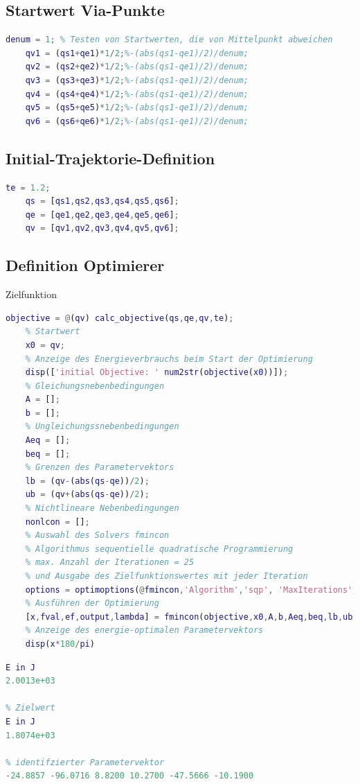 \subsection{Startwert Via-Punkte}
%
\begin{lstlisting}[language=Matlab, numbers=none]
	denum = 1; % Testen von Startwerten, die von Mittelpunkt abweichen
	qv1 = (qs1+qe1)*1/2;%-(abs(qs1-qe1)/2)/denum;
	qv2 = (qs2+qe2)*1/2;%-(abs(qs1-qe1)/2)/denum;
	qv3 = (qs3+qe3)*1/2;%-(abs(qs1-qe1)/2)/denum;
	qv4 = (qs4+qe4)*1/2;%-(abs(qs1-qe1)/2)/denum;
	qv5 = (qs5+qe5)*1/2;%-(abs(qs1-qe1)/2)/denum;
	qv6 = (qs6+qe6)*1/2;%-(abs(qs1-qe1)/2)/denum;
\end{lstlisting}
%
\subsection{Initial-Trajektorie-Definition}
%
\begin{lstlisting}[language=Matlab, numbers=none]
	te = 1.2;
	qs = [qs1,qs2,qs3,qs4,qs5,qs6];
	qe = [qe1,qe2,qe3,qe4,qe5,qe6];
	qv = [qv1,qv2,qv3,qv4,qv5,qv6];
\end{lstlisting}
%
\subsection{Definition Optimierer}
%
\begin{par}
	Zielfunktion
\end{par} \vspace{1em}
\begin{lstlisting}[language=Matlab, numbers=none]
	objective = @(qv) calc_objective(qs,qe,qv,te);
	% Startwert
	x0 = qv;
	% Anzeige des Energieverbrauchs beim Start der Optimierung
	disp(['initial Objective: ' num2str(objective(x0))]);
	% Gleichungsnebenbedingungen
	A = [];
	b = [];
	% Ungleichungssnebenbedingungen
	Aeq = [];
	beq = [];
	% Grenzen des Parametervektors
	lb = (qv-(abs(qs-qe))/2);
	ub = (qv+(abs(qs-qe))/2);
	% Nichtlineare Nebenbedingungen
	nonlcon = [];
	% Auswahl des Solvers fmincon
	% Algorithmus sequentielle quadratische Programmierung
	% max. Anzahl der Iterationen = 25
	% und Ausgabe des Zielfunktionswertes mit jeder Iteration
	options = optimoptions(@fmincon,'Algorithm','sqp', 'MaxIterations', 25,'PlotFcn',@optimplotfval);
	% Ausführen der Optimierung
	[x,fval,ef,output,lambda] = fmincon(objective,x0,A,b,Aeq,beq,lb,ub,nonlcon,options);
	% Anzeige des energie-optimalen Parametervektors
	disp(x*180/pi)
\end{lstlisting}
\color{lightgray} \begin{lstlisting}[language=Matlab, numbers=none]
% Startwert
E in J
2.0013e+03

% Zielwert
E in J
1.8074e+03

% identifzierter Parametervektor
-24.8857 -96.0716 8.8200 10.2700 -47.5666 -10.1900

\end{lstlisting} \color{black}
%
%
%

